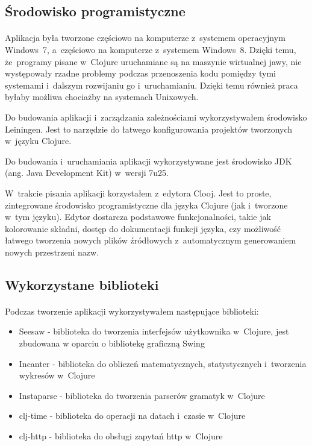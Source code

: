 \subsection{Środowisko programistyczne}

\paragraph{}
Aplikacja była tworzone częściowo na komputerze z~systemem operacyjnym Windows~7, a~częściowo na komputerze z~systemem Windows~8. Dzięki temu, że~programy pisane w~Clojure uruchamiane są na maszynie wirtualnej jawy, nie występowały rzadne problemy podczas przenoszenia kodu pomiędzy tymi systemami i~dalszym rozwijaniu go i~uruchamianiu. Dzięki temu również praca byłaby możliwa chociażby na systemach Unixowych.

Do budowania aplikacji i~zarządzania zależnościami wykorzystywałem środowisko Leiningen\cite{leiningen}. Jest to narzędzie do łatwego konfigurowania projektów tworzonych w~języku Clojure. 

Do budowania i~uruchamiania aplikacji wykorzystywane jest środowisko JDK (ang. Java Development Kit) w~wersji 7u25.

W~trakcie pisania aplikacji korzystałem z~edytora Clooj\cite{clooj}. Jest to proste, zintegrowane środowisko programistyczne dla języka Clojure (jak i~tworzone w~tym języku). Edytor dostarcza podstawowe funkcjonalności, takie jak kolorowanie składni, dostęp do dokumentacji funkcji języka, czy możliwość łatwego tworzenia nowych plików źródłowych z~automatycznym generowaniem nowych przestrzeni nazw.

\subsection{Wykorzystane biblioteki}

\paragraph{}
Podczas tworzenie aplikacji wykorzystywałem następujące biblioteki:
\begin{itemize}
	\item Seesaw\cite{seesaw} - biblioteka do tworzenia interfejsów użytkownika w~Clojure, jest zbudowana w oparciu o bibliotekę graficzną Swing
	\item Incanter\cite{incanter} - biblioteka do obliczeń matematycznych, statystycznych i~tworzenia wykresów w~Clojure
	\item Instaparse\cite{instaparse} - biblioteka do tworzenia parserów gramatyk w~Clojure
	\item clj-time\cite{clj-time} - biblioteka do operacji na datach i~czasie w~Clojure
	\item clj-http\cite{clj-http} - biblioteka do obsługi zapytań http w~Clojure
\end{itemize}

